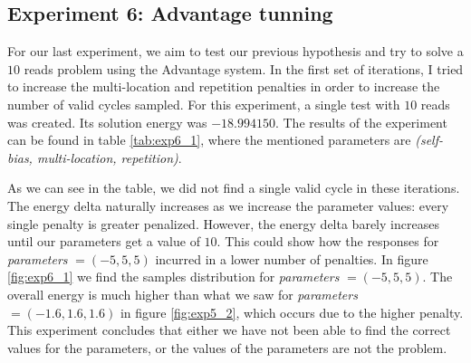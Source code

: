 \subsection{Experiment 6: Advantage tunning}


For our last experiment, we aim to test our previous hypothesis and try to solve a $10$ reads problem using the Advantage system. In the first set of iterations, I tried to increase the multi-location and repetition penalties in order to increase the number of valid cycles sampled. For this experiment, a single test with $10$ reads was created. Its solution energy was  $-18.994150$. The results of the experiment can be found in table \ref{tab:exp6_1}, where the mentioned parameters are \emph{(self-bias, multi-location, repetition)}.

\begin{table}[H]
	\centering
	\caption{Results of experiment 6, $10.000$ reads using the quantum annealer for different parameters configurations.}
	\label{tab:exp6_1}
\end{table}

As we can see in the table, we did not find a single valid cycle in these iterations. The energy delta naturally increases as we increase the parameter values: every single penalty is greater penalized. However, the energy delta barely increases until our parameters get a value of $10$. This could show how the responses for \emph{parameters} $= (-5, 5, 5)$ incurred in a lower number of penalties. In figure \ref{fig:exp6_1} we find the samples distribution for \emph{parameters} $= (-5, 5, 5)$. The overall energy is much higher than what we saw for \emph{parameters} $= (-1.6, 1.6, 1.6)$ in figure \ref{fig:exp5_2}, which occurs due to the higher penalty. This experiment concludes that either we have not been able to find the correct values for the parameters, or the values of the parameters are not the problem.

